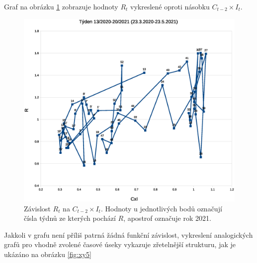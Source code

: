 Graf na obrázku \ref{fig:xy} zobrazuje hodnoty $R_{t}$ vykreslené oproti násobku
$C_{t-2}\times I_{t}$. 
\begin{figure}
\begin{center}
\includegraphics[scale=0.4]{pic/epi}
\caption{Závislost $R_t$ na $C_{t-2} \times I_t$. Hodnoty u jednotlivých bodů označují čísla týdnů ze kterých pochází $R$, apostrof označuje rok 2021.}
\label{fig:xy}
\end{center}
\end{figure}
Jakkoli v grafu není příliš patrná žádná funkční závislost, vykreslení analogických grafů 
pro vhodně zvolené časové úseky vykazuje 
zřetelnější strukturu, jak je ukázáno na obrázku \ref{fig:xy5}
